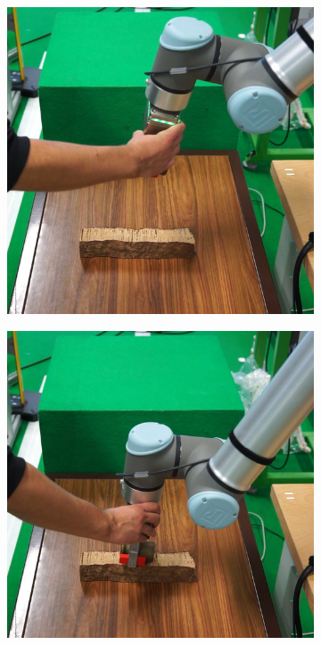 \begin{figure}[h]
\begin{subfigure}{.2\linewidth}
    \end{subfigure}%
    \begin{subfigure}{.2\linewidth}
        \centering
        \includegraphics[width=.95\linewidth]{figs/chp6/om_test_6.jpg}
    \end{subfigure}%
    \begin{subfigure}{.2\linewidth}
        \centering
        \includegraphics[width=.95\linewidth]{figs/chp6/om_test_7.jpg}

\end{subfigure}
\end{figure}
